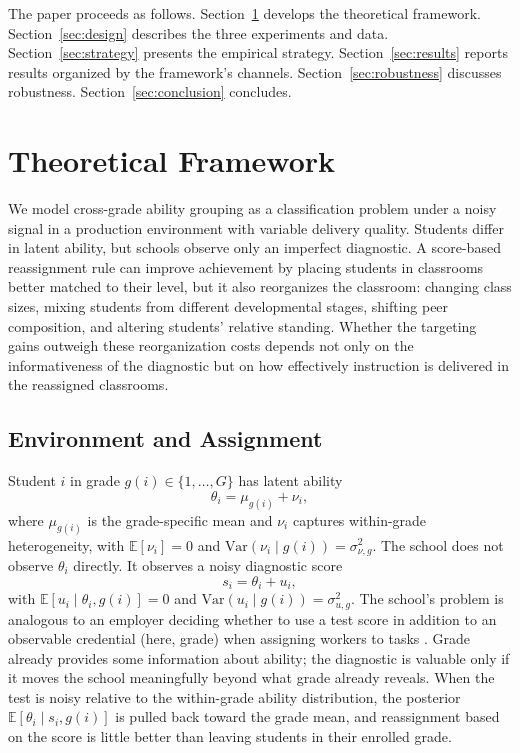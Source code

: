 \documentclass[11pt]{article}
\newcommand{\E}{\mathbb{E}}
\begin{document}
The paper proceeds as follows. Section~\ref{sec:theory} develops the theoretical framework. Section~\ref{sec:design} describes the three experiments and data. Section~\ref{sec:strategy} presents the empirical strategy. Section~\ref{sec:results} reports results organized by the framework's channels. Section~\ref{sec:robustness} discusses robustness. Section~\ref{sec:conclusion} concludes.

\section{Theoretical Framework}
\label{sec:theory}

We model cross-grade ability grouping as a classification problem under a noisy signal in a production environment with variable delivery quality. Students differ in latent ability, but schools observe only an imperfect diagnostic. A score-based reassignment rule can improve achievement by placing students in classrooms better matched to their level, but it also reorganizes the classroom: changing class sizes, mixing students from different developmental stages, shifting peer composition, and altering students' relative standing. Whether the targeting gains outweigh these reorganization costs depends not only on the informativeness of the diagnostic but on how effectively instruction is delivered in the reassigned classrooms.

\subsection{Environment and Assignment}

Student $i$ in grade $g(i) \in \{1, \ldots, G\}$ has latent ability
\begin{equation}
\label{eq:ability}
\theta_i = \mu_{g(i)} + \nu_i,
\end{equation}
where $\mu_{g(i)}$ is the grade-specific mean and $\nu_i$ captures within-grade heterogeneity, with $\E[\nu_i] = 0$ and $\text{Var}(\nu_i \mid g(i)) = \sigma^2_{\nu,g}$. The school does not observe $\theta_i$ directly. It observes a noisy diagnostic score
\begin{equation}
\label{eq:score}
s_i = \theta_i + u_i,
\end{equation}
with $\E[u_i \mid \theta_i, g(i)] = 0$ and $\text{Var}(u_i \mid g(i)) = \sigma^2_{u,g}$. The school's problem is analogous to an employer deciding whether to use a test score in addition to an observable credential (here, grade) when assigning workers to tasks \citep{AutorScarborough2008}. Grade already provides some information about ability; the diagnostic is valuable only if it moves the school meaningfully beyond what grade already reveals. When the test is noisy relative to the within-grade ability distribution, the posterior $\E[\theta_i \mid s_i, g(i)]$ is pulled back toward the grade mean, and reassignment based on the score is little better than leaving students in their enrolled grade.
\end{document}
